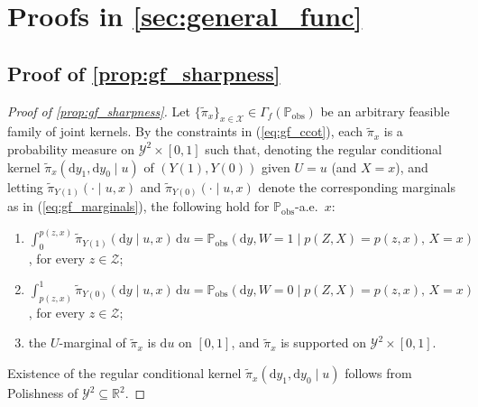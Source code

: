 \section{Proofs in \cref{sec:general_func}}\label{sec:proofs_gf}

\subsection{Proof of \cref{prop:gf_sharpness}}

\begin{proof}[Proof of \cref{prop:gf_sharpness}]
    Let $\{\tilde{\pi}_x\}_{x \in \mathcal{X}} \in \Gamma_f(\mathbb{P}_{\text{obs}})$ be an arbitrary feasible family of joint kernels. By the constraints in (\ref{eq:gf_ccot}), each $\tilde{\pi}_x$ is a probability measure on $\mathcal{Y}^2 \times [0,1]$ such that, denoting the regular conditional kernel $\tilde{\pi}_x(\mathrm{d}y_1, \mathrm{d}y_0 \mid u)$ of $(Y(1), Y(0))$ given $U = u$ (and $X = x$), and letting $\tilde{\pi}_{Y(1)}(\cdot \mid u, x)$ and $\tilde{\pi}_{Y(0)}(\cdot \mid u, x)$ denote the corresponding marginals as in (\ref{eq:gf_marginals}), the following hold for $\mathbb{P}_{\text{obs}}$-a.e.\ $x$:
    \begin{enumerate}
        \item[(G1)] $\displaystyle \int_0^{p(z,x)} \tilde{\pi}_{Y(1)}(\mathrm{d}y \mid u, x)\,\mathrm{d}u = \mathbb{P}_{\text{obs}}(\mathrm{d}y, W\!=\!1 \mid p(Z,X)\!=\!p(z,x),\, X\!=\!x)$, for every $z \in \mathcal{Z}$;
        \item[(G2)] $\displaystyle \int_{p(z,x)}^{1} \tilde{\pi}_{Y(0)}(\mathrm{d}y \mid u, x)\,\mathrm{d}u = \mathbb{P}_{\text{obs}}(\mathrm{d}y, W\!=\!0 \mid p(Z,X)\!=\!p(z,x),\, X\!=\!x)$, for every $z \in \mathcal{Z}$;
        \item[(G3)] the $U$-marginal of $\tilde{\pi}_x$ is $\mathrm{d}u$ on $[0,1]$, and $\tilde{\pi}_x$ is supported on $\mathcal{Y}^2 \times [0,1]$.
    \end{enumerate}
    Existence of the regular conditional kernel $\tilde{\pi}_x(\mathrm{d}y_1, \mathrm{d}y_0 \mid u)$ follows from Polishness of $\mathcal{Y}^2 \subseteq \mathbb{R}^2$.


\end{proof}
